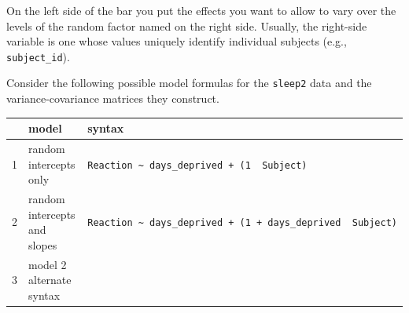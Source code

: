 \documentclass[]{book}
\begin{document}
On the left side of the bar \texttt{\textbar{}} you put the effects you want to allow to vary over the levels of the random factor named on the right side. Usually, the right-side variable is one whose values uniquely identify individual subjects (e.g., \texttt{subject\_id}).

Consider the following possible model formulas for the \texttt{sleep2} data and the variance-covariance matrices they construct.

\begin{longtable}[]{@{}lll@{}}
\toprule
\begin{minipage}[b]{0.04\columnwidth}\raggedright
\strut
\end{minipage} & \begin{minipage}[b]{0.35\columnwidth}\raggedright
model\strut
\end{minipage} & \begin{minipage}[b]{0.53\columnwidth}\raggedright
syntax\strut
\end{minipage}\tabularnewline
\midrule
\endhead
\begin{minipage}[t]{0.04\columnwidth}\raggedright
1\strut
\end{minipage} & \begin{minipage}[t]{0.35\columnwidth}\raggedright
random intercepts only\strut
\end{minipage} & \begin{minipage}[t]{0.53\columnwidth}\raggedright
\texttt{Reaction\ \textasciitilde{}\ days\_deprived\ +\ (1\ \textbar{}\ Subject)}\strut
\end{minipage}\tabularnewline
\begin{minipage}[t]{0.04\columnwidth}\raggedright
2\strut
\end{minipage} & \begin{minipage}[t]{0.35\columnwidth}\raggedright
random intercepts and slopes\strut
\end{minipage} & \begin{minipage}[t]{0.53\columnwidth}\raggedright
\texttt{Reaction\ \textasciitilde{}\ days\_deprived\ +\ (1\ +\ days\_deprived\ \textbar{}\ Subject)}\strut
\end{minipage}\tabularnewline
\begin{minipage}[t]{0.04\columnwidth}\raggedright
3\strut
\end{minipage} & \begin{minipage}[t]{0.35\columnwidth}\raggedright
model 2 alternate syntax\strut
\end{minipage} & \begin{minipage}[t]{0.53\columnwidth}\raggedright

\end{minipage}
\end{longtable}
\end{document}
